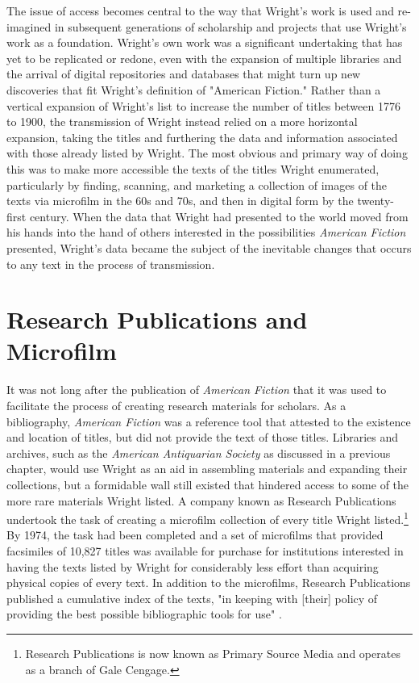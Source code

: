 The issue of access becomes central to the way that Wright's work is used and re-imagined in subsequent generations of scholarship and projects that use Wright's work as a foundation. Wright's own work was a significant undertaking that has yet to be replicated or redone, even with the expansion of multiple libraries and the arrival of digital repositories and databases that might turn up new discoveries that fit Wright's definition of "American Fiction." Rather than a vertical expansion of Wright's list to increase the number of titles between 1776 to 1900, the transmission of Wright instead relied on a more horizontal expansion, taking the titles and furthering the data and information associated with those already listed by Wright. The most obvious and primary way of doing this was to make more accessible the texts of the titles Wright enumerated, particularly by finding, scanning, and marketing a collection of images of the texts via microfilm in the 60s and 70s, and then in digital form by the twenty-first century. When the data that Wright had presented to the world moved from his hands into the hand of others interested in the possibilities \textit{American Fiction} presented, Wright's data became the subject of the inevitable changes that occurs to any text in the process of transmission. 

\section{Research Publications and Microfilm}
It was not long after the publication of \textit{American Fiction} that it was used to facilitate the process of creating research materials for scholars. As a bibliography, \textit{American Fiction} was a reference tool that attested to the existence and location of titles, but did not provide the text of those titles. Libraries and archives, such as the \textit{American Antiquarian Society} as discussed in a previous chapter, would use Wright as an aid in assembling materials and expanding their collections, but a formidable wall still existed that hindered access to some of the more rare materials Wright listed. A company known as Research Publications undertook the task of creating a microfilm collection of every title Wright listed.\footnote{Research Publications is now known as Primary Source Media and operates as a branch of Gale Cengage.} By 1974, the task had been completed and a set of microfilms that provided facsimiles of 10,827 titles was available for purchase for institutions interested in having the texts listed by Wright for considerably less effort than acquiring physical copies of every text. In addition to the microfilms, Research Publications published a cumulative index of the texts, "in keeping with [their] policy of providing the best possible bibliographic tools for use" \autocite[n.p.]{wright_american_1974}. 

